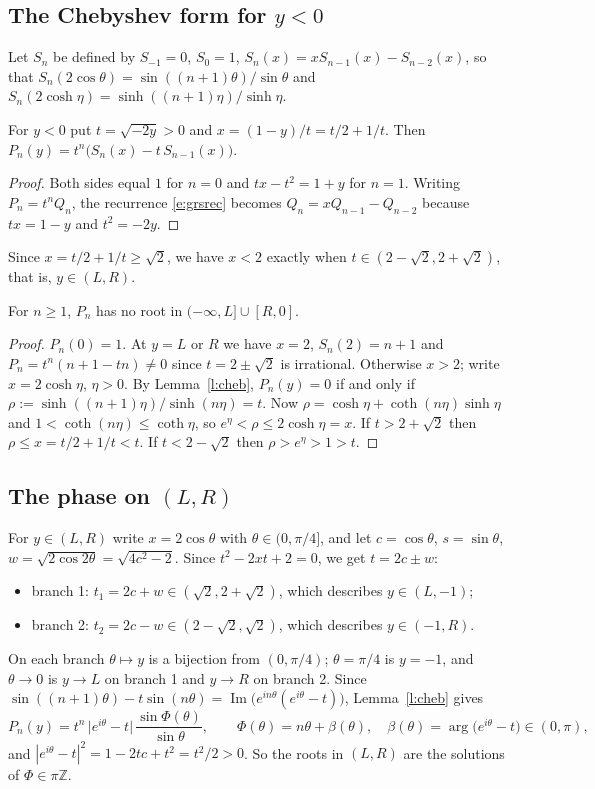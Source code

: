 \subsection{The Chebyshev form for \texorpdfstring{$y<0$}{y<0}}
Let $S_n$ be defined by $S_{-1}=0$, $S_0=1$, $S_n(x)=xS_{n-1}(x)-S_{n-2}(x)$, so that
$S_n(2\cos\theta)=\sin((n+1)\theta)/\sin\theta$ and $S_n(2\cosh\eta)=\sinh((n+1)\eta)/\sinh\eta$.

\begin{lemma}\label{l:cheb}
For $y<0$ put $t=\sqrt{-2y}>0$ and $x=(1-y)/t=t/2+1/t$. Then $P_n(y)=t^n\bigl(S_n(x)-t\,S_{n-1}(x)\bigr)$.
\end{lemma}
\begin{proof}
Both sides equal $1$ for $n=0$ and $tx-t^2=1+y$ for $n=1$. Writing $P_n=t^nQ_n$, the recurrence \eqref{e:grsrec}
becomes $Q_n=xQ_{n-1}-Q_{n-2}$ because $tx=1-y$ and $t^2=-2y$.
\end{proof}
Since $x=t/2+1/t\ge\sqrt2$, we have $x<2$ exactly when $t\in(2-\sqrt2,2+\sqrt2)$, that is, $y\in(L,R)$.

\begin{lemma}\label{l:outside}
For $n\ge1$, $P_n$ has no root in $(-\infty,L]\cup[R,0]$.
\end{lemma}
\begin{proof}
$P_n(0)=1$. At $y=L$ or $R$ we have $x=2$, $S_n(2)=n+1$ and $P_n=t^n(n+1-tn)\ne0$ since $t=2\pm\sqrt2$
is irrational. Otherwise $x>2$; write $x=2\cosh\eta$, $\eta>0$. By Lemma~\ref{l:cheb}, $P_n(y)=0$ if and only if
$\rho:=\sinh((n+1)\eta)/\sinh(n\eta)=t$. Now $\rho=\cosh\eta+\coth(n\eta)\sinh\eta$ and
$1<\coth(n\eta)\le\coth\eta$, so $e^\eta<\rho\le2\cosh\eta=x$. If $t>2+\sqrt2$ then $\rho\le x=t/2+1/t<t$.
If $t<2-\sqrt2$ then $\rho>e^\eta>1>t$.
\end{proof}

\subsection{The phase on \texorpdfstring{$(L,R)$}{(L,R)}}
For $y\in(L,R)$ write $x=2\cos\theta$ with $\theta\in(0,\pi/4]$, and let $c=\cos\theta$, $s=\sin\theta$,
$w=\sqrt{2\cos2\theta}=\sqrt{4c^2-2}$. Since $t^2-2xt+2=0$, we get $t=2c\pm w$:
\begin{itemize}
\item branch 1: $t_1=2c+w\in(\sqrt2,2+\sqrt2)$, which describes $y\in(L,-1)$;
\item branch 2: $t_2=2c-w\in(2-\sqrt2,\sqrt2)$, which describes $y\in(-1,R)$.
\end{itemize}
On each branch $\theta\mapsto y$ is a bijection from $(0,\pi/4)$; $\theta=\pi/4$ is $y=-1$, and
$\theta\to0$ is $y\to L$ on branch 1 and $y\to R$ on branch 2. Since
$\sin((n+1)\theta)-t\sin(n\theta)=\operatorname{Im}\bigl(e^{in\theta}(e^{i\theta}-t)\bigr)$, Lemma~\ref{l:cheb} gives
\begin{equation}\label{e:phase}
P_n(y)=t^n\,\bigl|e^{i\theta}-t\bigr|\,\frac{\sin\Phi(\theta)}{\sin\theta},\qquad
\Phi(\theta)=n\theta+\beta(\theta),\quad \beta(\theta)=\arg\bigl(e^{i\theta}-t\bigr)\in(0,\pi),
\end{equation}
and $|e^{i\theta}-t|^2=1-2tc+t^2=t^2/2>0$. So the roots in $(L,R)$ are the solutions of $\Phi\in\pi\mathbb Z$.

